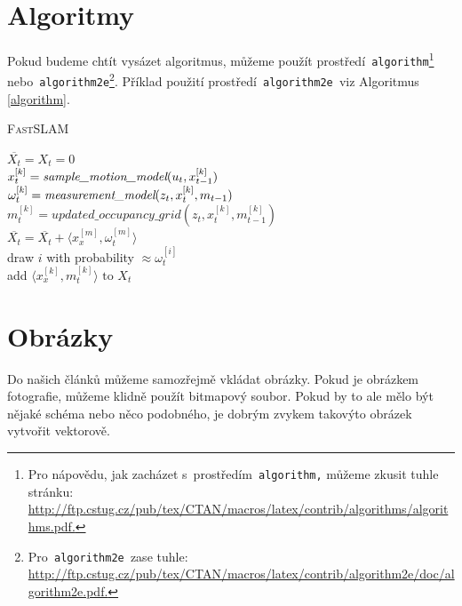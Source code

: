 \documentclass[a4paper,11pt]{article}
\begin{document}
\section{Algoritmy}\label{third}

Pokud budeme chtít vysázet algoritmus, můžeme použít prostředí\texttt{ algorithm}\footnote{Pro nápovědu, jak zacházet s~prostředím\texttt{ algorithm,} můžeme zkusit tuhle stránku:\\ \url{http://ftp.cstug.cz/pub/tex/CTAN/macros/latex/contrib/algorithms/algorithms.pdf.}} nebo\texttt{ algorithm2e}\footnote{Pro\texttt{ algorithm2e }zase tuhle: \url{http://ftp.cstug.cz/pub/tex/CTAN/macros/latex/contrib/algorithm2e/doc/algorithm2e.pdf.}}. Příklad použití prostředí\texttt{ algorithm2e }viz Algoritmus \ref{algorithm}.\\
\IncMargin{2.5em}
\begin{algorithm}
\caption{\textsc{FastSLAM}}
\label{algorithm}
        
\SetNlSty{}{}{:}
\SetNlSkip{0.4em}
\SetInd{1em}{1em}

\Indm\Indpp
{}
\Indmm\Indp
\BlankLine
$\overline{X_t}=X_t=0$ \\
{
$x_t^{[k]}=\emph{sample\_motion\_model}(u_t,x_{t-1}^{[k]})$ \\
$\omega_t^{[k]}=\emph{measurement\_model}(z_t,x_t^{[k]},m_{t-1})$ \\
$m_t^{[k]}=updated\_occupancy\_grid(z_t,x_t^{[k]},m_{t-1}^{[k]})$\\
$\overline{X_t}=\overline{X_t}+\langle x_x^{[m]},\omega_t^{[m]}\rangle$ \\
}
{
draw $i$ with probability $\approx \omega_t^{[i]}$ \\
add $\langle x_x^{[k]},m_t^{[k]}\rangle \textrm{ to }X_t$ \\
}
\end{algorithm}
\DecMargin{2.5em}




\section{Obrázky}

Do našich článků můžeme samozřejmě vkládat obrázky. Pokud je obrázkem fotografie, můžeme klidně použít bitmapový soubor. Pokud by to ale mělo být nějaké schéma nebo něco podobného, je dobrým zvykem takovýto obrázek vytvořit vektorově.
\end{document}
